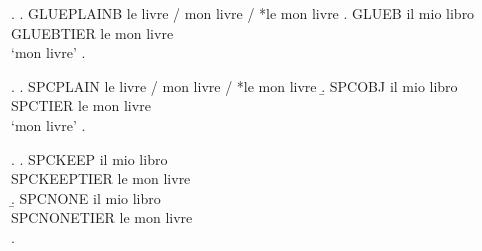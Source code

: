 \ex.
\a. GLUEPLAINB le livre / mon livre / *le mon livre
\bg. GLUEB il mio libro\\
     GLUEBTIER le mon livre\\
\glt `mon livre'
\z.

\ex.
\a. SPCPLAIN le livre / mon livre / *le mon livre
\b. \gll SPCOBJ il mio libro\\
         SPCTIER le mon livre\\
    \glt `mon livre'
\z.

\ex.
\a. \gll SPCKEEP il mio libro\\
         SPCKEEPTIER le mon livre\\
\b. \gll SPCNONE il mio libro\\
         SPCNONETIER le mon livre\\
\z.

